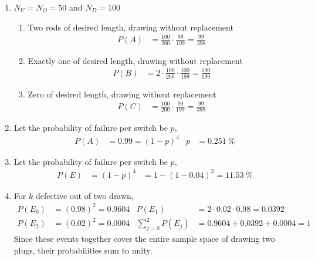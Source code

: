 \begin{enumerate}
    \item $ N_U = N_O = 50 $ and $ N_D = 100 $
          \begin{enumerate}
              \item Two rods of desired length, drawing without replacement
                    \begin{align}
                        P(A) & = \frac{100}{200} \cdot \frac{99}{199} = \frac{99}{398}
                    \end{align}
              \item Exactly one of desired length, drawing without replacement
                    \begin{align}
                        P(B) & = 2 \cdot \frac{100}{200} \cdot \frac{100}{199}
                        = \frac{100}{199}
                    \end{align}
              \item Zero of desired length, drawing without replacement
                    \begin{align}
                        P(C) & = \frac{100}{200} \cdot \frac{99}{199} = \frac{99}{398}
                    \end{align}
          \end{enumerate}

    \item Let the probability of failure per switch be $ p $,
          \begin{align}
              P(A) & = 0.99 = (1-p)^4 & p & = \SI{0.251}{\percent}
          \end{align}

    \item Let the probability of failure per switch be $ p $,
          \begin{align}
              P(E) & = (1-p)^4 & = 1 - (1-0.04)^3 = \SI{11.53}{\percent}
          \end{align}

    \item For $k$ defective out of two drawn,
          \begin{align}
              P(E_0)                & = (0.98)^2 = 0.9604                &
              P(E_1)                & = 2 \cdot 0.02 \cdot 0.98 = 0.0392   \\
              P(E_2)                & = (0.02)^2 = 0.0004                &
              \sum_{j=0}^{2} P(E_j) & = 0.9604 + 0.0392 + 0.0004 = 1
          \end{align}
          Since these events together cover the entire sample space of drawing two
          plugs, their probabilities sum to unity.


\end{enumerate}
